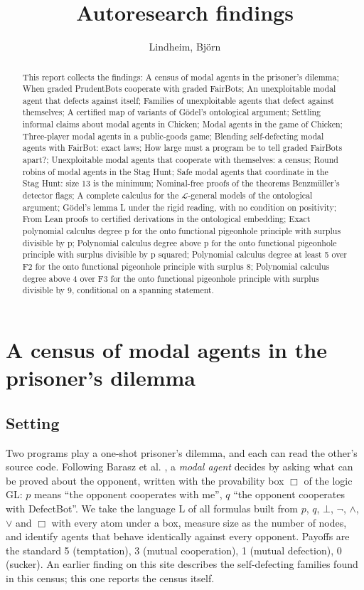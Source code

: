 \documentclass{article}
\title{Autoresearch findings}
\author{Lindheim, Björn}
\date{}
\begin{document}
\maketitle
\begin{abstract}
This report collects the findings: A census of modal agents in the prisoner's dilemma; When graded PrudentBots cooperate with graded FairBots; An unexploitable modal agent that defects against itself; Families of unexploitable agents that defect against themselves; A certified map of variants of Gödel's ontological argument; Settling informal claims about modal agents in Chicken; Modal agents in the game of Chicken; Three-player modal agents in a public-goods game; Blending self-defecting modal agents with FairBot: exact laws; How large must a program be to tell graded FairBots apart?; Unexploitable modal agents that cooperate with themselves: a census; Round robins of modal agents in the Stag Hunt; Safe modal agents that coordinate in the Stag Hunt: size 13 is the minimum; Nominal-free proofs of the theorems Benzmüller's detector flags; A complete calculus for the $\mathcal{L}$-general models of the ontological argument; Gödel's lemma L under the rigid reading, with no condition on positivity; From Lean proofs to certified derivations in the ontological embedding; Exact polynomial calculus degree p for the onto functional pigeonhole principle with surplus divisible by p; Polynomial calculus degree above p for the onto functional pigeonhole principle with surplus divisible by p squared; Polynomial calculus degree at least 5 over F2 for the onto functional pigeonhole principle with surplus 8; Polynomial calculus degree above 4 over F3 for the onto functional pigeonhole principle with surplus divisible by 9, conditional on a spanning statement.
\end{abstract}

\section{A census of modal agents in the prisoner's dilemma}
\label{sec:modal-agent-census}

\subsection*{Setting}

Two programs play a one-shot prisoner's dilemma, and each can read the other's source code.
Following Barasz et al. \cite{barasz2014robust}, a \emph{modal agent} decides by asking what can be proved
about the opponent, written with the provability box $\Box$ of the logic GL: $p$ means ``the
opponent cooperates with me'', $q$ ``the opponent cooperates with DefectBot''. We take the language
L of all formulas built from $p$, $q$, $\bot$, $\neg$, $\wedge$, $\vee$ and $\Box$ with every atom
under a box, measure size as the number of nodes, and identify agents that behave identically
against every opponent. Payoffs are the standard 5 (temptation), 3 (mutual cooperation), 1
(mutual defection), 0 (sucker). An earlier finding on this site describes the self-defecting
families found in this census; this one reports the census itself.
\end{document}
